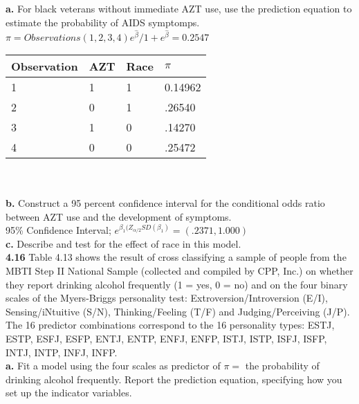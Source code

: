 \documentclass[paper=letter, fontsize=11pt]{scrartcl} %
\begin{document}
\textbf{a.} For black veterans without immediate AZT use, use the prediction equation to 
estimate the probability of AIDS symptomps. \\
$\pi = Observations(1,2,3,4)e^{\hat{\beta}}/1+e^{\hat{\beta}} = 0.2547$

\begin{tabular}{|l|l|l|l|}
\hline
Observation & AZT & Race & $\pi$   \\ \hline
1           & 1   & 1    & 0.14962 \\ \hline
2           & 0   & 1    & .26540  \\ \hline
3           & 1   & 0    & .14270  \\ \hline
4           & 0   & 0    & .25472  \\ \hline
\end{tabular}
\\
\\

\textbf{b.} Construct a 95 percent confidence interval for the conditional odds ratio 
between AZT use and the development of symptoms. \\
95\% Confidence Interval; $e^{\beta_1(Z_{\alpha/2}SD(\beta_1)} = (.2371, 1.000)$
\\

\textbf{c.} Describe and test for the effect of race in this model. \\

\textbf{4.16} Table 4.13 shows the result of cross classifying a sample of people from 
the MBTI Step II National Sample (collected and compiled by CPP, Inc.) on whether they 
report drinking alcohol frequently (1 = yes, 0 = no) and on the four binary scales of 
the Myers-Briggs personality test: Extroversion/Introversion (E/I), Sensing/iNtuitive 
(S/N), Thinking/Feeling (T/F) and Judging/Perceiving (J/P). The 16 predictor combinations
correspond to the 16 personality types: ESTJ, ESTP, ESFJ, ESFP, ENTJ, ENTP, ENFJ, ENFP,
ISTJ, ISTP, ISFJ, ISFP, INTJ, INTP, INFJ, INFP. \\

\textbf{a.} Fit a model using the four scales as predictor of $\pi =$ the probability of
drinking alcohol frequently. Report the prediction equation, specifying how you set up 
the indicator variables. \\
\end{document}
